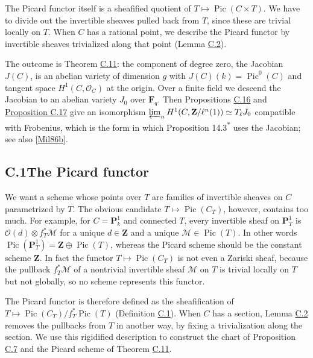 \documentclass[11pt]{article}
\newcommand{\bpout}[1]{#1\textsuperscript{\hyperlink{bp-outside}{\ensuremath{\ast}}}}
\begin{document}
The Picard functor itself is a sheafified quotient of \(T\mapsto\operatorname{Pic}(C\times T)\). We have to divide out the invertible sheaves pulled back from \(T\), since these are trivial locally on \(T\). When \(C\) has a rational point, we describe the Picard functor by invertible sheaves trivialized along that point (Lemma \hyperref[bp125]{C.2}).

The outcome is Theorem \hyperref[bp154]{C.11}: the component of degree zero, the Jacobian \(J(C)\), is an abelian variety of dimension \(g\) with \(J(C)(k)=\operatorname{Pic}^0(C)\) and tangent space \(H^1(C,\mathcal O_C)\) at the origin. Over a finite field we descend the Jacobian to an abelian variety \(J_0\) over \(\mathbf F_q\). Then Propositions \hyperref[bp167]{C.16} and \hyperref[bp170]{Proposition C.17} give an isomorphism \(\varprojlim_nH^1(C,\mathbf Z/\ell^n(1))\simeq T_\ell J_0\) compatible with Frobenius, which is the form in which Proposition \bpout{14.3} uses the Jacobian; see also [\hyperref[bp352]{Mil86b}].

\subsection*{\texorpdfstring{C.1\quad The Picard functor}{C.1 The Picard functor}}
\label{bp121}%
\label{bp122}%
We want a scheme whose points over \(T\) are families of invertible sheaves on \(C\) parametrized by \(T\). The obvious candidate \(T\mapsto\operatorname{Pic}(C_T)\), however, contains too much. For example, for \(C=\mathbf P^1_k\) and connected \(T\), every invertible sheaf on \(\mathbf P^1_T\) is \(\mathcal O(d)\otimes f_T^*\mathcal M\) for a unique \(d\in\mathbf Z\) and a unique \(\mathcal M\in\operatorname{Pic}(T)\). In other words \(\operatorname{Pic}(\mathbf P^1_T)=\mathbf Z\oplus\operatorname{Pic}(T)\), whereas the Picard scheme should be the constant scheme \(\mathbf Z\). In fact the functor \(T\mapsto\operatorname{Pic}(C_T)\) is not even a Zariski sheaf, because the pullback \(f_T^*\mathcal M\) of a nontrivial invertible sheaf \(\mathcal M\) on \(T\) is trivial locally on \(T\) but not globally, so no scheme represents this functor.

The Picard functor is therefore defined as the sheafification of \(T\mapsto\operatorname{Pic}(C_T)/f_T^*\operatorname{Pic}(T)\) (Definition \hyperref[bp123]{C.1}). When \(C\) has a section, Lemma \hyperref[bp125]{C.2} removes the pullbacks from \(T\) in another way, by fixing a trivialization along the section. We use this rigidified description to construct the chart of Proposition \hyperref[bp142]{C.7} and the Picard scheme of Theorem \hyperref[bp154]{C.11}.
\end{document}
